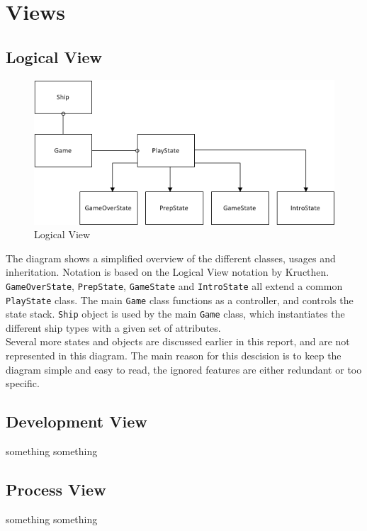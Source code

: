 \chapter{Views}
\section{Logical View}

\begin{figure}[h]
	\includegraphics[width=\textwidth]{LogicalView.png}
	\caption{Logical View}
	\label{fig:LogicalView}
\end{figure}

The diagram shows a simplified overview of the different classes, usages and inheritation. Notation is based on the Logical View notation by Kructhen.\cite{kruchten} 
\\
\texttt{GameOverState}, \texttt{PrepState}, \texttt{GameState} and \texttt{IntroState} all extend a common \texttt{PlayState} class. The main \texttt{Game} class functions as a controller, and controls the state stack. \texttt{Ship} object is used by the main \texttt{Game} class, which instantiates the different ship types with a given set of attributes.
\\
Several more states and objects are discussed earlier in this report, and are not represented in this diagram. The main reason for this descision is to keep the diagram simple and easy to read, the ignored features are either redundant or too specific. 

\section{Development View}
something something

\section{Process View}
something something